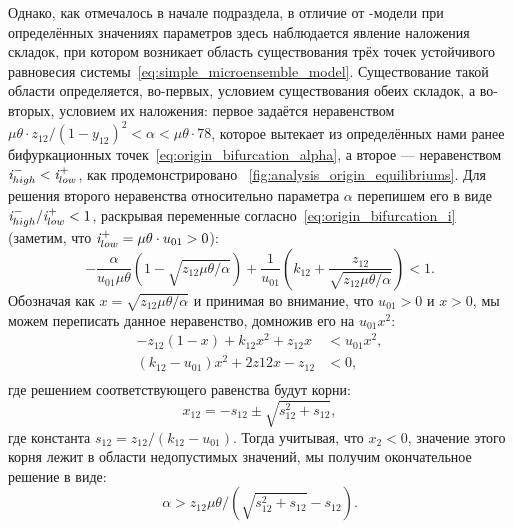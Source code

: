 Однако, как отмечалось в начале подраздела, в отличие от -модели при определённых значениях параметров здесь наблюдается явление наложения складок, при котором возникает область существования трёх точек устойчивого равновесия системы~\eqref{eq:simple_microensemble_model}. Существование такой области определяется, во-первых, условием существования обеих складок, а во-вторых, условием их наложения: первое задаётся неравенством  $\mu \theta \cdot z_{12} / (1 - y_{12})^2 < \alpha < \mu \theta \cdot 78$, которое вытекает из определённых нами ранее бифуркационных точек~\eqref{eq:origin_bifurcation_alpha}, а второе --- неравенством $\mathit{i}_{high}^{-} < \mathit{i}_{low}^{+}$, как продемонстрировано \onfigure~\ref{fig:analysis_origin_equilibriums}. Для решения второго неравенства относительно параметра $\alpha$ перепишем его в виде $\mathit{i}_{high}^{-} / \mathit{i}_{low}^{+} < 1$, раскрывая переменные согласно~\eqref{eq:origin_bifurcation_i} (заметим, что $\mathit{i}_{low}^{+} = \mu \theta \cdot u_{01} > 0$):
\begin{equation}
    \nonumber
    -\dfrac{\alpha}{u_{01}\mu\theta}\left(1 - \sqrt{z_{12}\mu\theta/\alpha}\right) + \dfrac{1}{u_{01}}\left(k_{12} + \dfrac{z_{12}}{\sqrt{z_{12}\mu\theta/\alpha}}\right) < 1.
\end{equation}
Обозначая как $x = \sqrt{z_{12}\mu\theta/\alpha}$ и принимая во внимание, что $u_{01} > 0$ и $x > 0$, мы можем переписать данное неравенство, домножив его на $u_{01} x^{2}$:
\begin{equation}
    \nonumber
    \begin{aligned}
        -z_{12} (1 - x)+ k_{12} x^{2} + z_{12} x        &< u_{01} x^{2}, \\
        (k_{12} - u_{01}) x^{2} + 2 z{12} x - z_{12}    &< 0, \\
    \end{aligned}
\end{equation}
где решением соответствующего равенства будут корни:
\begin{equation}
    \nonumber
    x_{12} = -s_{12} \pm \sqrt{s_{12}^{2} + s_{12}},
\end{equation}
где константа $s_{12} = z_{12} / (k_{12} - u_{01})$. Тогда учитывая, что $x_{2} < 0$, \ie значение этого корня лежит в области недопустимых значений, мы получим окончательное решение в виде:
\begin{equation}
    \nonumber
    \alpha > z_{12} \mu \theta / (\sqrt{s_{12}^{2} + s_{12}} - s_{12}). %
\end{equation}


